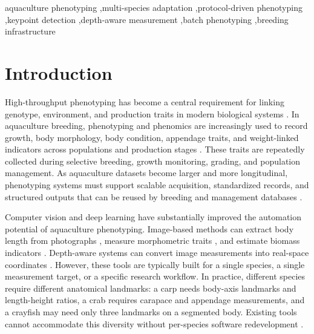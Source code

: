 \documentclass[final,3p,times]{elsarticle}
\begin{document}
\begin{frontmatter}
\begin{keyword}
aquaculture phenotyping \sep multi-species adaptation \sep protocol-driven phenotyping \sep keypoint detection \sep depth-aware measurement \sep batch phenotyping \sep breeding infrastructure
\end{keyword}

\end{frontmatter}

\section{Introduction}

High-throughput phenotyping has become a central requirement for linking genotype, environment, and production traits in modern biological systems \citep{houle2010phenomics}. In aquaculture breeding, phenotyping and phenomics are increasingly used to record growth, body morphology, body condition, appendage traits, and weight-linked indicators across populations and production stages \citep{fu2022phenotyping,zhao2024biotech}. These traits are repeatedly collected during selective breeding, growth monitoring, grading, and population management. As aquaculture datasets become larger and more longitudinal, phenotyping systems must support scalable acquisition, standardized records, and structured outputs that can be reused by breeding and management databases \citep{tuckey2022automated}.

Computer vision and deep learning have substantially improved the automation potential of aquaculture phenotyping. Image-based methods can extract body length from photographs \citep{strachan1993length,monkman2019machine,marrable2023generalised}, measure morphometric traits \citep{zion2012computer,navarro2016imafish,yu2023keypoint,he2024measurement}, and estimate biomass indicators \citep{saberioon2017machine,fernandes2020segmentation,liu2023objectdetection,li2020nonintrusive,zhang2024biomass}. Depth-aware systems can convert image measurements into real-space coordinates \citep{zhao2025stereo,zhou2023inwater,tonachella2022fishial}. However, these tools are typically built for a single species, a single measurement target, or a specific research workflow. In practice, different species require different anatomical landmarks: a carp needs body-axis landmarks and length-height ratios, a crab requires carapace and appendage measurements, and a crayfish may need only three landmarks on a segmented body. Existing tools cannot accommodate this diversity without per-species software redevelopment \citep{liu2024fishphenokey,he2024measurement}.
\end{document}
